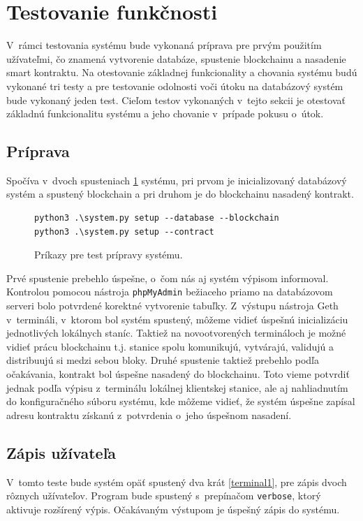 \section{Testovanie funkčnosti}
V~rámci testovania systému bude vykonaná príprava pre prvým použitím užívateľmi, čo znamená vytvorenie databáze, spustenie blockchainu a nasadenie smart kontraktu. Na otestovanie základnej funkcionality a chovania systému budú vykonané tri testy a pre testovanie odolnosti voči útoku na databázový systém bude vykonaný jeden test. Cieľom testov vykonaných v~tejto sekcii je otestovať základnú funkcionalitu systému a jeho chovanie v~prípade pokusu o~útok.

\subsection{Príprava}
Spočíva v~dvoch spusteniach \ref{terminal0} systému, pri prvom je inicializovaný databázový systém a spustený blockchain a pri druhom je do blockchainu nasadený kontrakt.
\begin{figure}[hbt]
\renewcommand\figurename{Výpis kódu}
\begin{Verbatim}[frame=single]
python3 .\system.py setup --database --blockchain
python3 .\system.py setup --contract
\end{Verbatim}
    \caption{Príkazy pre test prípravy systému.}
	\label{terminal0}
\end{figure}

Prvé spustenie prebehlo úspešne, o~čom nás aj systém výpisom informoval. Kontrolou pomocou nástroja \texttt{phpMyAdmin} bežiaceho priamo na databázovom serveri bolo potvrdené korektné vytvorenie tabuľky. Z~výstupu nástroja Geth v~termináli, v~ktorom bol systém spustený, môžeme vidieť úspešnú inicializáciu jednotlivých lokálnych staníc. Taktiež na novootvorených termináloch je možné vidieť prácu blockchainu t.j. stanice spolu komunikujú, vytvárajú, validujú a distribuujú si medzi sebou bloky.
Druhé spustenie taktiež prebehlo podľa očakávania, kontrakt bol úspešne nasadený do blockchainu. Toto vieme potvrdiť jednak podľa výpisu z~terminálu lokálnej klientskej stanice, ale aj nahliadnutím do konfiguračného súboru systému, kde môžeme vidieť, že systém úspešne zapísal adresu kontraktu získanú z~potvrdenia o~jeho úspešnom nasadení.

\subsection{Zápis užívateľa}
V~tomto teste bude systém opäť spustený dva krát \ref{terminal1}, pre zápis dvoch rôznych užívateľov. Program bude spustený s~prepínačom \texttt{verbose}, ktorý aktivuje rozšírený výpis. Očakávaným výstupom je úspešný zápis do systému.

